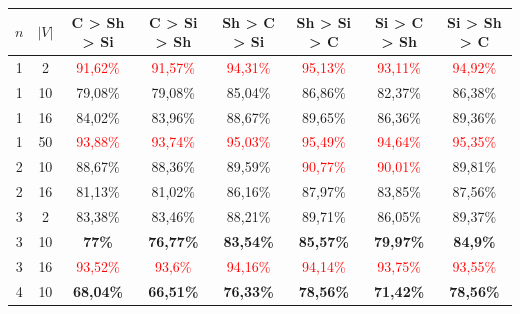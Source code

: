 \begin{table}[ht]
    \centering
    \begin{tabular}{cc|c|c|c|c|c|c}
        \toprule
        $n$ & $|V|$ & \textbf{C > Sh > Si}     & \textbf{C > Si > Sh}     & \textbf{Sh > C > Si}     & \textbf{Sh > Si > C}     & \textbf{Si > C > Sh}     & \textbf{Si > Sh > C}     \\\midrule
        {1} & {2}   & \textcolor{red}{91,62\%} & \textcolor{red}{91,57\%} & \textcolor{red}{94,31\%} & \textcolor{red}{95,13\%} & \textcolor{red}{93,11\%} & \textcolor{red}{94,92\%} \\
        {1} & {10}  & {79,08\%}                & {79,08\%}                & {85,04\%}                & {86,86\%}                & {82,37\%}                & {86,38\%}                \\
        {1} & {16}  & {84,02\%}                & {83,96\%}                & {88,67\%}                & {89,65\%}                & {86,36\%}                & {89,36\%}                \\
        {1} & {50}  & \textcolor{red}{93,88\%} & \textcolor{red}{93,74\%} & \textcolor{red}{95,03\%} & \textcolor{red}{95,49\%} & \textcolor{red}{94,64\%} & \textcolor{red}{95,35\%} \\
        {2} & {10}  & {88,67\%}                & {88,36\%}                & {89,59\%}                & \textcolor{red}{90,77\%} & \textcolor{red}{90,01\%} & {89,81\%}                \\
        {2} & {16}  & {81,13\%}                & {81,02\%}                & {86,16\%}                & {87,97\%}                & {83,85\%}                & {87,56\%}                \\
        {3} & {2}   & {83,38\%}                & {83,46\%}                & {88,21\%}                & {89,71\%}                & {86,05\%}                & {89,37\%}                \\
        {3} & {10}  & \textbf{77\%}            & \textbf{76,77\%}         & \textbf{83,54\%}         & \textbf{85,57\%}         & \textbf{79,97\%}         & \textbf{84,9\%}          \\
        {3} & {16}  & \textcolor{red}{93,52\%} & \textcolor{red}{93,6\%}  & \textcolor{red}{94,16\%} & \textcolor{red}{94,14\%} & \textcolor{red}{93,75\%} & \textcolor{red}{93,55\%} \\
        {4} & {10}  & \textbf{68,04\%}         & \textbf{66,51\%}         & \textbf{76,33\%}         & \textbf{78,56\%}         & \textbf{71,42\%}         & \textbf{78,56\%}         \\

\end{tabular}
\end{table}
